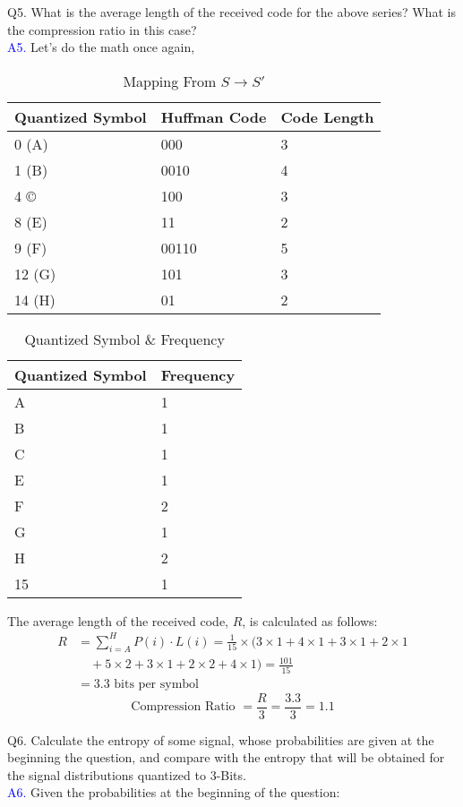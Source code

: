 \documentclass[letterpaper, 12pt]{article}
\begin{document}
Q5. What is the average length of the received code for the above series? What is the compression ratio in this case? \\
\textcolor{blue}{A5.} Let's do the math once again,\\
\begin{table}[htbp]
\centering
\begin{tabular}{lll}
\toprule
Quantized Symbol & Huffman Code & Code Length \\
\midrule
0 (A) & 000 & 3 \\
1 (B) & 0010 & 4 \\
4 © & 100 & 3 \\
8 (E) & 11 & 2 \\
9 (F) & 00110 & 5 \\
12 (G) & 101 & 3 \\
14 (H) & 01 & 2 \\
\bottomrule
\end{tabular}
\caption{Mapping From $S \rightarrow S'$}
\label{tab:mytable}
\end{table}

\begin{table}[htbp]
\centering
\begin{tabular}{ll}
\toprule
Quantized Symbol & Frequency \\
\midrule
A & 1 \\
B & 1 \\
C & 1 \\
E & 1 \\
F & 2 \\
G & 1 \\
H & 2 \\
15 & 1 \\
\bottomrule
\end{tabular}
\caption{Quantized Symbol \& Frequency}
\label{tab:mytable}
\end{table}
The average length of the received code, $R$, is calculated as follows:
\begin{align*}
R  &= \sum_{i=A}^{H} P(i) \cdot L(i) = \frac{1}{15} \times (3 \times 1 + 4 \times 1 + 3 \times 1 + 2 \times 1 \\
& \quad + 5 \times 2 + 3 \times 1 + 2 \times 2 + 4 \times 1) = \frac{101}{15} \\
&= 3.3 \text{ bits per symbol}
\end{align*}
\[\text{Compression Ratio } = \frac{R}{3} = \frac{3.3}{3} =1.1 \]


Q6. Calculate the entropy of some signal, whose probabilities are given at the beginning
the question, and compare with the entropy that will be obtained for the signal distributions quantized to 3-Bits. \\
\textcolor{blue}{A6.} Given the probabilities at the beginning of the question:
\end{document}
